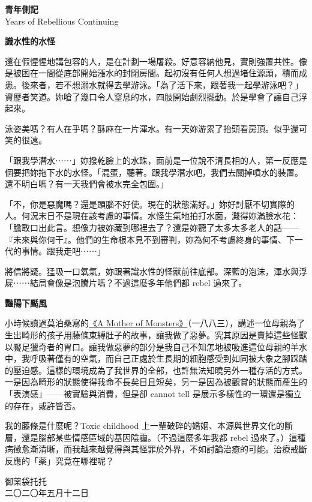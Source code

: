 \documentclass[10pt]{article}
\begin{document}
\begin{flushleft}
\textbf{青年側記}\\
Years of Rebellious Continuing\\
\end{flushleft}
\vspace{3em}

\textbf{識水性的水怪}

還在假惺惺地講包容的人，是在計劃一場屠殺。好意容納他見，實則強置共性。像是被困在一間從底部開始漲水的封閉房間。起初沒有任何人想過堵住源頭，積而成患。後來者，若不想溺水就得去學游泳。「為了活下來，跟著我一起學游泳吧？」資歷者笑道。妳嗆了幾口令人窒息的水，四肢開始劇烈擺動。於是學會了讓自己浮起來。

泳姿美嗎？有人在乎嗎？酥麻在一片渾水。有一天妳游累了抬頭看房頂。似乎還可笑的很遠。

「跟我學潛水⋯⋯」妳撥乾臉上的水珠，面前是一位說不清長相的人，第一反應是個要把妳拖下水的水怪。「混蛋，聽著。跟我學潛水吧，我們去關掉噴水的裝置。還不明白嗎？有一天我們會被水完全包圍。」

「不，你是惡魔嗎？還是頭腦不好使。現在的狀態滿好。」妳好討厭不切實際的人。何況末日不是現在該考慮的事情。水怪生氣地拍打水面，濺得妳滿臉水花：「膽敢口出此言。想像力被妳藏到哪裡去了？還是妳聽了太多太多老人的話{——}『未來與你何干』。他們的生命根本見不到審判，妳為何不考慮終身的事情、下一代的事情。跟我走吧⋯⋯」

將信將疑。猛吸一口氧氣，妳跟著識水性的怪獸前往底部。深藍的泡沫，渾水與浮屍⋯⋯結局會像是泡騰片嗎？不過這麼多年他們都
rebel 過來了。

\vspace{1em}
\textbf{豔陽下颳風}

小時候讀過莫泊桑寫的\href{http://www.online-literature.com/maupassant/4276/}{《A
Mother of
Monsters》}（一八八三），講述一位母親為了生出畸形的孩子用藤條束縛肚子的故事，讓我做了惡夢。究其原因是賣掉這些怪獸以饜足獵奇者的胃口。讓我做惡夢的部分是我自己不知怎地被吸進這位母親的羊水中，我呼吸著僅有的空氣，而自己正處於生長期的細胞感受到如同被大象之腳踩踏的壓迫感。這樣的環境成為了我世界的全部，也許無法知曉另外一種存活的方式。一是因為畸形的狀態使得我命不長矣目且短矣，另一是因為被觀賞的狀態而產生的「表演感」{——}被實驗與消費，但是卻
cannot tell 是展示多樣性的一環還是獨立的存在，或許皆否。

我的藤條是什麼呢？Toxic childhood
上一輩破碎的婚姻、本源與世界文化的斷層，還是腦部某些情感區域的基因陰霾。（不過這麼多年我都
rebel
過來了。）這種病徵愈漸清晰，而我越來越覺得與其怪罪於外界，不如討論治癒的可能。治療戒斷反應的「{薬}」究竟在哪裡呢？

\vspace{3em}
\begin{flushleft}
\small{御薬袋托托\\
二〇二〇年五月十二日}
\end{flushleft}
\end{document}
